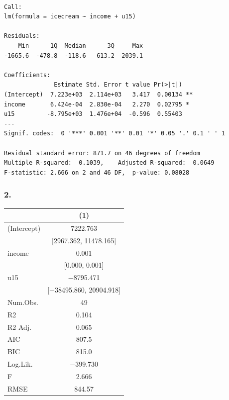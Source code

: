\documentclass[
  letterpaper,
  DIV=11,
  numbers=noendperiod]{scrreprt}
\newenvironment{Shaded}{\begin{snugshade}}{\end{snugshade}}
\newcommand{\AttributeTok}[1]{\textcolor[rgb]{0.40,0.45,0.13}{#1}}
\newcommand{\FunctionTok}[1]{\textcolor[rgb]{0.28,0.35,0.67}{#1}}
\newcommand{\NormalTok}[1]{\textcolor[rgb]{0.00,0.23,0.31}{#1}}
\newcommand{\OtherTok}[1]{\textcolor[rgb]{0.00,0.23,0.31}{#1}}
\newcommand{\SpecialCharTok}[1]{\textcolor[rgb]{0.37,0.37,0.37}{#1}}
\newcommand{\StringTok}[1]{\textcolor[rgb]{0.13,0.47,0.30}{#1}}
\begin{document}
\begin{verbatim}

Call:
lm(formula = icecream ~ income + u15)

Residuals:
    Min      1Q  Median      3Q     Max 
-1665.6  -478.8  -118.6   613.2  2039.1 

Coefficients:
              Estimate Std. Error t value Pr(>|t|)   
(Intercept)  7.223e+03  2.114e+03   3.417  0.00134 **
income       6.424e-04  2.830e-04   2.270  0.02795 * 
u15         -8.795e+03  1.476e+04  -0.596  0.55403   
---
Signif. codes:  0 '***' 0.001 '**' 0.01 '*' 0.05 '.' 0.1 ' ' 1

Residual standard error: 871.7 on 46 degrees of freedom
Multiple R-squared:  0.1039,    Adjusted R-squared:  0.0649 
F-statistic: 2.666 on 2 and 46 DF,  p-value: 0.08028
\end{verbatim}

\hypertarget{section-2}{%
\subsubsection{2.}\label{section-2}}

\begin{Shaded}
\end{Shaded}

\begin{table}
\centering
\begin{tabular}[t]{lc}
\toprule
  & (1)\\
\midrule
(Intercept) & \num{7222.763}\\
 & {}[\num{2967.362}, \num{11478.165}]\\
income & \num{0.001}\\
 & {}[\num{0.000}, \num{0.001}]\\
u15 & \num{-8795.471}\\
 & {}[\num{-38495.860}, \num{20904.918}]\\
\midrule
Num.Obs. & \num{49}\\
R2 & \num{0.104}\\
R2 Adj. & \num{0.065}\\
AIC & \num{807.5}\\
BIC & \num{815.0}\\
Log.Lik. & \num{-399.730}\\
F & \num{2.666}\\
RMSE & \num{844.57}\\
\bottomrule
\end{tabular}
\end{table}
\end{document}
